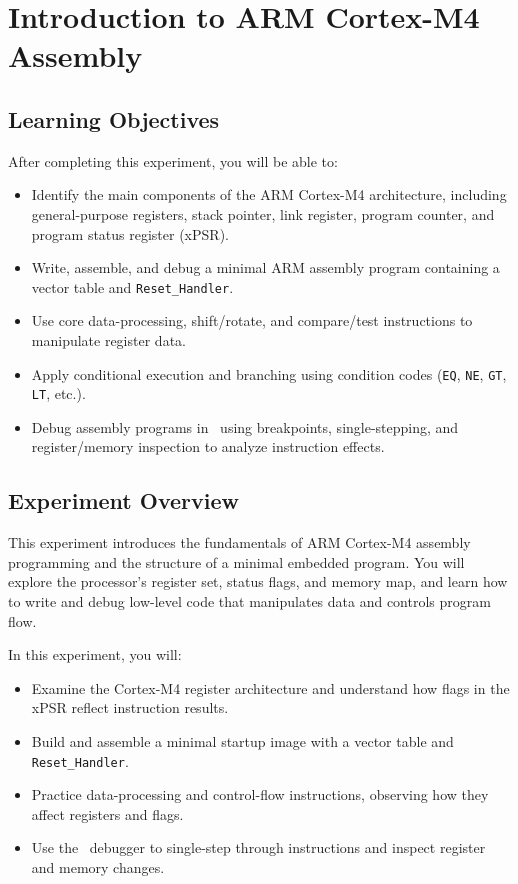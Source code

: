 \chapter{Introduction to ARM Cortex-M4 Assembly}
\section*{Learning Objectives}
After completing this experiment, you will be able to:
\begin{itemize}[nosep]
  \item Identify the main components of the ARM Cortex-M4 architecture, including general-purpose registers, stack pointer, link register, program counter, and program status register (xPSR).
  \item Write, assemble, and debug a minimal ARM assembly program containing a vector table and \texttt{Reset\_Handler}.
  \item Use core data-processing, shift/rotate, and compare/test instructions to manipulate register data.
  \item Apply conditional execution and branching using condition codes (\texttt{EQ}, \texttt{NE}, \texttt{GT}, \texttt{LT}, etc.).
  \item Debug assembly programs in \keil\ using breakpoints, single-stepping, and register/memory inspection to analyze instruction effects.
\end{itemize}

\section*{Experiment Overview}
This experiment introduces the fundamentals of ARM Cortex-M4 assembly programming and the structure of a minimal embedded program. 
You will explore the processor's register set, status flags, and memory map, and learn how to write and debug low-level code that manipulates data and controls program flow.

\noindent In this experiment, you will:
\begin{itemize}[nosep]
  \item Examine the Cortex-M4 register architecture and understand how flags in the xPSR reflect instruction results.
  \item Build and assemble a minimal startup image with a vector table and \texttt{Reset\_Handler}.
  \item Practice data-processing and control-flow instructions, observing how they affect registers and flags.
  \item Use the \keil\ debugger to single-step through instructions and inspect register and memory changes.
\end{itemize}

